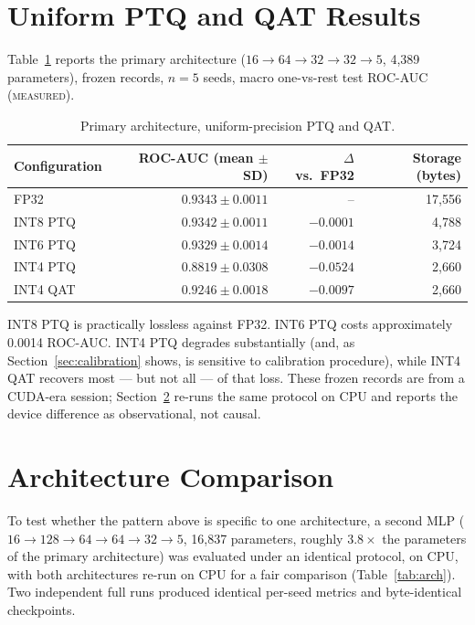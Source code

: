 \documentclass[11pt]{article}
\newcommand{\tierm}{\textsc{measured}}
\begin{document}
\section{Uniform PTQ and QAT Results}
\label{sec:uniform}

Table~\ref{tab:uniform} reports the primary architecture ($16 \to 64 \to 32 \to 32 \to 5$,
4{,}389 parameters), frozen records, $n=5$ seeds, macro one-vs-rest test ROC-AUC (\tierm{}).

\begin{table}[h]
\centering
\caption{Primary architecture, uniform-precision PTQ and QAT.}
\label{tab:uniform}
\begin{tabular}{lrrr}
\toprule
Configuration & ROC-AUC (mean $\pm$ SD) & $\Delta$ vs.\ FP32 & Storage (bytes) \\
\midrule
FP32            & $0.9343 \pm 0.0011$ & --        & 17{,}556 \\
INT8 PTQ        & $0.9342 \pm 0.0011$ & $-0.0001$ & 4{,}788 \\
INT6 PTQ        & $0.9329 \pm 0.0014$ & $-0.0014$ & 3{,}724 \\
INT4 PTQ        & $0.8819 \pm 0.0308$ & $-0.0524$ & 2{,}660 \\
INT4 QAT        & $0.9246 \pm 0.0018$ & $-0.0097$ & 2{,}660 \\
\bottomrule
\end{tabular}
\end{table}

INT8 PTQ is practically lossless against FP32. INT6 PTQ costs approximately 0.0014 ROC-AUC. INT4 PTQ
degrades substantially (and, as Section~\ref{sec:calibration} shows, is sensitive to calibration
procedure), while INT4 QAT recovers most --- but not all --- of that loss. These frozen records are
from a CUDA-era session; Section~\ref{sec:architecture} re-runs the same protocol on CPU and reports
the device difference as observational, not causal.

\section{Architecture Comparison}
\label{sec:architecture}

To test whether the pattern above is specific to one architecture, a second MLP
($16 \to 128 \to 64 \to 64 \to 32 \to 5$, 16{,}837 parameters, roughly $3.8\times$ the
parameters of the primary architecture) was evaluated under an identical protocol, on CPU, with both
architectures re-run on CPU for a fair comparison (Table~\ref{tab:arch}). Two independent full runs
produced identical per-seed metrics and byte-identical checkpoints.
\end{document}
